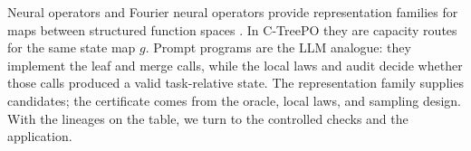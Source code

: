 Neural operators and Fourier neural operators provide representation families
for maps between structured function spaces
\citep{Kovachki23NeuralOperator,Li21FNO}. In C-TreePO they are capacity
routes for the same state map \(g\). Prompt programs are the LLM analogue:
they implement the leaf and merge calls, while the local laws and audit decide
whether those calls produced a valid task-relative state. The representation
family supplies candidates; the certificate comes from the oracle, local laws,
and sampling design. With the lineages on the table, we turn to the
controlled checks and the application.
